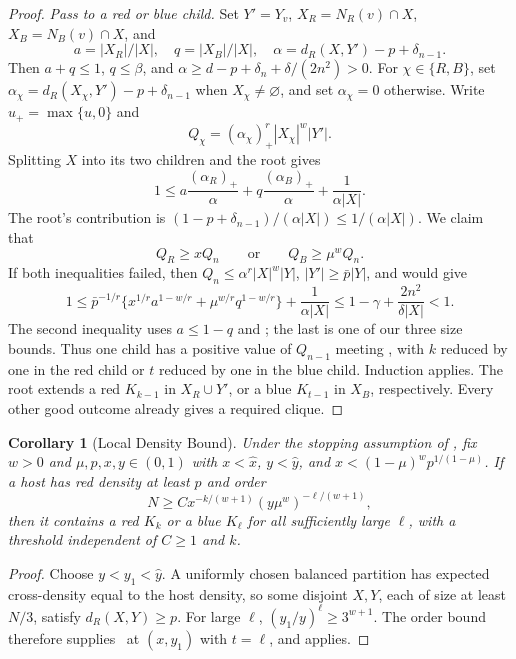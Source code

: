 \documentclass[11pt]{article}
\newtheorem{corollary}[lemma]{Corollary}
\theoremstyle{definition}
\newcommand{\pos}[1]{(#1)_+}
\begin{document}
\begin{proof}
\emph{Pass to a red or blue child.}
Set \(Y'=Y_v\), \(X_R=N_R(v)\cap X\), \(X_B=N_B(v)\cap X\), and
\[
 a=|X_R|/|X|,\quad q=|X_B|/|X|,\quad
 \alpha=d_R(X,Y')-p+\delta_{n-1}.
\]
Then \(a+q\le1\), \(q\le\beta\), and \(\alpha\ge d-p+\delta_n+\delta/(2n^2)>0\).
For \(\chi\in\{R,B\}\), set \(\alpha_\chi=d_R(X_\chi,Y')-p+\delta_{n-1}\) when \(X_\chi\ne\varnothing\), and set \(\alpha_\chi=0\) otherwise. Write \(u_+=\max\{u,0\}\) and
\[
 Q_\chi=\pos{\alpha_\chi}^{r}|X_\chi|^w|Y'|.
\]
Splitting \(X\) into its two children and the root gives
\begin{equation}\label{eq:split}
 1\le a\frac{\pos{\alpha_R}}\alpha
       +q\frac{\pos{\alpha_B}}\alpha+\frac1{\alpha|X|}.
\end{equation}
The root's contribution is \((1-p+\delta_{n-1})/(\alpha|X|)\le1/(\alpha|X|)\).
We claim that
\[
 Q_R\ge xQ_n\qquad\text{or}\qquad Q_B\ge\mu^wQ_n.
\]
If both inequalities failed, then \(Q_n\le\alpha^r|X|^w|Y|\), \(|Y'|\ge\bar p|Y|\), and  would give
\[
 1\le\bar p^{-1/r}
 \{x^{1/r}a^{1-w/r}+\mu^{w/r}q^{1-w/r}\}
 +\frac1{\alpha|X|}
 \le1-\gamma+\frac{2n^2}{\delta|X|}<1.
\]
The second inequality uses \(a\le1-q\) and ; the last is one of our three size bounds.
Thus one child has a positive value of \(Q_{n-1}\) meeting , with \(k\) reduced by one in the red child or \(t\) reduced by one in the blue child. Induction applies. The root extends a red \(K_{k-1}\) in \(X_R\cup Y'\), or a blue \(K_{t-1}\) in \(X_B\), respectively. Every other good outcome already gives a required clique.
\end{proof}

\begin{corollary}[Local Density Bound]\label{cor:local-density}
Under the stopping assumption of , fix $w>0$ and $\mu,p,x,y\in(0,1)$ with
$x<\widehat x$, $y<\widehat y$, and $x<(1-\mu)^wp^{1/(1-\mu)}$.
If a host has red density at least $p$ and order
\begin{equation}\label{eq:local-density}
 N\ge Cx^{-k/(w+1)}(y\mu^w)^{-\ell/(w+1)},
\end{equation}
then it contains a red $K_k$ or a blue $K_\ell$ for all sufficiently large $\ell$, with a threshold independent of $C\ge1$ and $k$.
\end{corollary}
\begin{proof}
Choose $y<y_1<\widehat y$.
A uniformly chosen balanced partition has expected cross-density equal to the host density, so some disjoint $X,Y$, each of size at least $N/3$, satisfy $d_R(X,Y)\ge p$.
For large $\ell$, $(y_1/y)^\ell\ge3^{w+1}$.
The order bound therefore supplies~ at $(x,y_1)$ with $t=\ell$, and  applies.
\end{proof}
\end{document}
